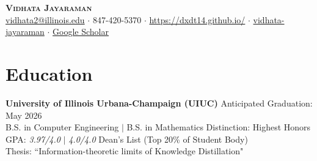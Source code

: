\documentclass[letterpaper,10pt]{article}
\begin{document}
\begin{center}
    \textbf{\Huge \scshape Vidhata Jayaraman} \\ \vspace{5pt}
    \small
     \href{mailto:vidhata2@illinois.edu}{vidhata2@illinois.edu} $ \cdot $
     847-420-5370 $ \cdot $
     \href{https://dxdt14.github.io/}{https://dxdt14.github.io/} $ \cdot $
     \href{https://www.linkedin.com/in/vidhata-jayaraman/}{vidhata-jayaraman} $ \cdot $
     \href{https://scholar.google.com/citations?user=f16twSMAAAAJ&hl=en}{Google Scholar}
\end{center}

\vspace{-3pt}

    
    \section{Education}
    \textbf{University of Illinois Urbana-Champaign (UIUC)} \hfill
    Anticipated Graduation: May 2026\\ 
    B.S. in Computer Engineering $|$ B.S. in Mathematics \hfill Distinction: Highest Honors\\
    GPA: \textit{ 3.97/4.0} $\vert$ \textit{4.0/4.0} \hfill 
    { \small Dean's List (Top 20\% of Student Body)} \\
    {\small Thesis: ``Information-theoretic limits of Knowledge Distillation"}\\
    
    
    
\end{document}
